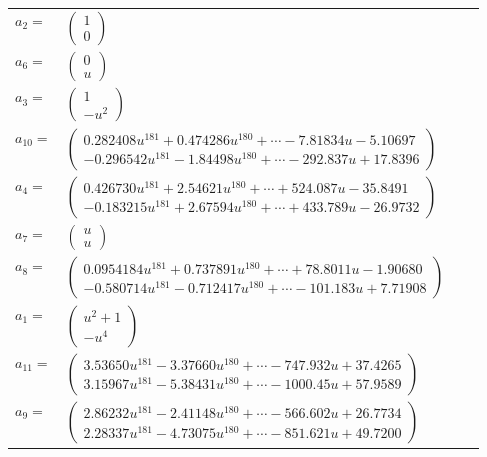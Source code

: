 \documentclass[1p]{elsarticle_modified}
\theoremstyle{definition}
\begin{document}
\begin{tabular}{m{7pt} m{180pt} m{7pt} m{180pt} }
\flushright $a_{2}=$&$\begin{pmatrix}1\\0\end{pmatrix}$ \\
\flushright $a_{6}=$&$\begin{pmatrix}0\\u\end{pmatrix}$ \\
\flushright $a_{3}=$&$\begin{pmatrix}1\\- u^2\end{pmatrix}$ \\
\flushright $a_{10}=$&$\begin{pmatrix}0.282408 u^{181}+0.474286 u^{180}+\cdots-7.81834 u-5.10697\\-0.296542 u^{181}-1.84498 u^{180}+\cdots-292.837 u+17.8396\end{pmatrix}$ \\
\flushright $a_{4}=$&$\begin{pmatrix}0.426730 u^{181}+2.54621 u^{180}+\cdots+524.087 u-35.8491\\-0.183215 u^{181}+2.67594 u^{180}+\cdots+433.789 u-26.9732\end{pmatrix}$ \\
\flushright $a_{7}=$&$\begin{pmatrix}u\\u\end{pmatrix}$ \\
\flushright $a_{8}=$&$\begin{pmatrix}0.0954184 u^{181}+0.737891 u^{180}+\cdots+78.8011 u-1.90680\\-0.580714 u^{181}-0.712417 u^{180}+\cdots-101.183 u+7.71908\end{pmatrix}$ \\
\flushright $a_{1}=$&$\begin{pmatrix}u^2+1\\- u^4\end{pmatrix}$ \\
\flushright $a_{11}=$&$\begin{pmatrix}3.53650 u^{181}-3.37660 u^{180}+\cdots-747.932 u+37.4265\\3.15967 u^{181}-5.38431 u^{180}+\cdots-1000.45 u+57.9589\end{pmatrix}$ \\
\flushright $a_{9}=$&$\begin{pmatrix}2.86232 u^{181}-2.41148 u^{180}+\cdots-566.602 u+26.7734\\2.28337 u^{181}-4.73075 u^{180}+\cdots-851.621 u+49.7200\end{pmatrix}$ \\

\end{tabular}
\end{document}
